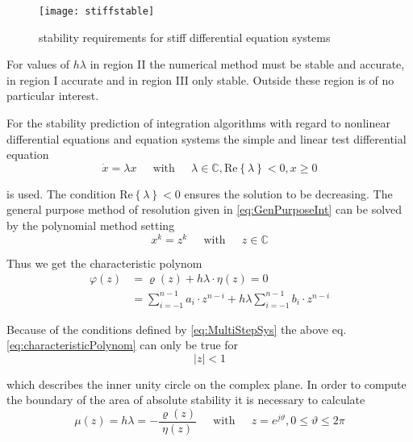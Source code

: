 \begin{figure}[ht]
\begin{center}
\texttt{[image: stiffstable]}
\end{center}
\caption{stability requirements for stiff differential equation systems}
\label{fig:StiffStable}
\end{figure}
\FloatBarrier

For values of $h\lambda$ in region II the numerical method must be
stable and accurate, in region I accurate and in region III only
stable.  Outside these region is of no particular interest.

\addvspace{12pt}

For the stability prediction of integration algorithms with regard to
nonlinear differential equations and equation systems the simple and
linear test differential equation
\begin{equation}
\dot{x} = \lambda x
\;\;\;\; \textrm{ with } \;\;\;\;
\lambda \in \mathbb{C}, \text{Re}\left\{\lambda\right\} < 0, x \ge 0
\end{equation}

is used.  The condition $\text{Re}\left\{\lambda\right\} < 0$ ensures
the solution to be decreasing.  The general purpose method of
resolution given in \eqref{eq:GenPurposeInt} can be solved by the
polynomial method setting
\begin{equation}
x^k = z^k
\;\;\;\; \textrm{ with } \;\;\;\;
z \in \mathbb{C}
\end{equation}

Thus we get the characteristic polynom
\begin{align}
\label{eq:characteristicPolynom}
\varphi\left(z\right) &= \varrho\left(z\right) + h\lambda \cdot \eta\left(z\right) = 0\\
&= \sum^{n-1}_{i=-1} a_i\cdot z^{n-i} + h\lambda \sum^{n-1}_{i=-1} b_i\cdot z^{n-i}
\end{align}

Because of the conditions defined by \eqref{eq:MultiStepSys} the above
eq. \eqref{eq:characteristicPolynom} can only be true for
\begin{equation}
\left|z\right| < 1
\end{equation}

which describes the inner unity circle on the complex plane.  In order
to compute the boundary of the area of absolute stability it is
necessary to calculate
\begin{equation}
\label{eq:StabArea}
\mu\left(z\right) = h\lambda = -\dfrac{\varrho\left(z\right)}{\eta\left(z\right)}
\;\;\;\; \textrm{ with } \;\;\;\;
z = e^{j\vartheta}, 0 \le \vartheta \le 2\pi
\end{equation}

